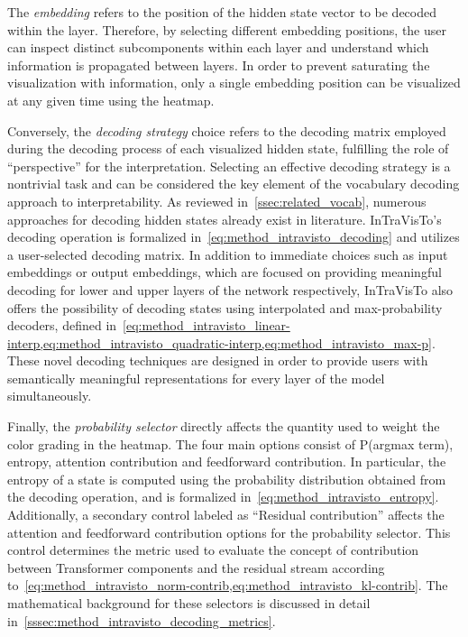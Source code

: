 The \emph{embedding} refers to the position of the hidden state vector to be decoded within the layer.
Therefore, by selecting different embedding positions, the user can inspect distinct subcomponents within each layer and understand which information is propagated between layers.
In order to prevent saturating the visualization with information, only a single embedding position can be visualized at any given time using the heatmap.

Conversely, the \emph{decoding strategy} choice refers to the decoding matrix employed during the decoding process of each visualized hidden state, fulfilling the role of ``perspective'' for the interpretation.
Selecting an effective decoding strategy is a nontrivial task and can be considered the key element of the vocabulary decoding approach to interpretability.
As reviewed in~\cref{ssec:related_vocab}, numerous approaches for decoding hidden states already exist in literature.
InTraVisTo's decoding operation is formalized in~\cref{eq:method_intravisto_decoding} and utilizes a user-selected decoding matrix.
In addition to immediate choices such as input embeddings or output embeddings, which are focused on providing meaningful decoding for lower and upper layers of the network respectively, InTraVisTo also offers the possibility of decoding states using interpolated and max-probability decoders, defined in~\cref{eq:method_intravisto_linear-interp,eq:method_intravisto_quadratic-interp,eq:method_intravisto_max-p}.
These novel decoding techniques are designed in order to provide users with semantically meaningful representations for every layer of the model simultaneously.

Finally, the \emph{probability selector} directly affects the quantity used to weight the color grading in the heatmap.
The four main options consist of P(argmax term), entropy, attention contribution and feedforward contribution. %
In particular, the entropy of a state is computed using the probability distribution obtained from the decoding operation, and is formalized in~\cref{eq:method_intravisto_entropy}.
Additionally, a secondary control labeled as ``Residual contribution'' affects the attention and feedforward contribution options for the probability selector.
This control determines the metric used to evaluate the concept of contribution between Transformer components and the residual stream according to~\cref{eq:method_intravisto_norm-contrib,eq:method_intravisto_kl-contrib}.
The mathematical background for these selectors is discussed in detail in~\cref{sssec:method_intravisto_decoding_metrics}.

